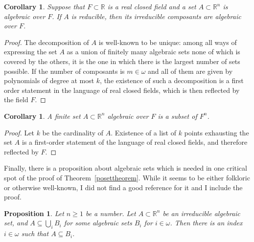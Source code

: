 \documentclass{article}
\newcommand{\gw}{\omega}
\newtheorem{corollary}[theorem]{Corollary}
\newtheorem{proposition}[theorem]{Proposition}
\theoremstyle{definition}
\begin{document}
\begin{corollary}
\label{c3}
Suppose that $F\subset\mathbb{R}$ is a real closed field and a set $A\subset\mathbb{R}^n$ is algebraic over $F$. If $A$ is reducible, then its irreducible composants are algebraic over $F$.
\end{corollary}

\begin{proof}
The decomposition of $A$ is well-known to be unique: among all ways of expressing the set $A$ as a union of finitely many algebraic sets none of which is covered by the others, it is the one in which there is the largest number of sets possible. If the number of composants is $m\in\gw$ and all of them are given by polynomials of degree at most $k$, the existence of such a decomposition is a first order statement in the language of real closed fields, which is then reflected by the field $F$.
\end{proof}

\begin{corollary}
\label{c4}
A finite set $A\subset\mathbb{R}^n$ algebraic over $F$ is a subset of $F^n$.
\end{corollary}

\begin{proof}
Let $k$ be the cardinality of $A$. Existence of a list of $k$ points exhausting the set $A$ is a first-order statement of the language of real closed fields, and therefore reflected by $F$.
\end{proof}

\noindent Finally, there is a proposition about algebraic sets which is needed in one critical spot of the proof of Theorem~\ref{posettheorem}. While it seems to be either folkloric or otherwise well-known, I did not find a good reference for it and I include the proof.

\begin{proposition}
\label{folkproposition}
Let $n\geq 1$ be a number. Let $A\subset\mathbb{R}^n$ be an irreducible algebraic set, and $A\subseteq\bigcup_iB_i$ for some algebraic sets $B_i$ for $i\in\gw$. Then there is an index $i\in\gw$ such that $A\subseteq B_i$.
\end{proposition}
\end{document}

